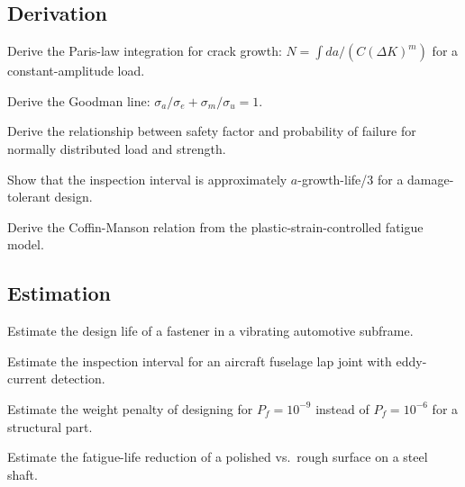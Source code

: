 \subsection*{Derivation}

\begin{exercise}
Derive the Paris-law integration for crack growth: $N = \int da/(C(\Delta K)^m)$ for a constant-amplitude load.
\end{exercise}

\begin{exercise}
Derive the Goodman line: $\sigma_a/\sigma_e + \sigma_m/\sigma_u = 1$.
\end{exercise}

\begin{exercise}
Derive the relationship between safety factor and probability of failure for normally distributed load and strength.
\end{exercise}

\begin{exercise}
Show that the inspection interval is approximately $a$-growth-life/3 for a damage-tolerant design.
\end{exercise}

\begin{exercise}
Derive the Coffin-Manson relation from the plastic-strain-controlled fatigue model.
\end{exercise}

\subsection*{Estimation}

\begin{exercise}
Estimate the design life of a fastener in a vibrating automotive subframe.
\end{exercise}

\begin{exercise}
Estimate the inspection interval for an aircraft fuselage lap joint with eddy-current detection.
\end{exercise}

\begin{exercise}
Estimate the weight penalty of designing for $P_f = 10^{-9}$ instead of $P_f = 10^{-6}$ for a structural part.
\end{exercise}

\begin{exercise}
Estimate the fatigue-life reduction of a polished vs.\ rough surface on a steel shaft.
\end{exercise}

